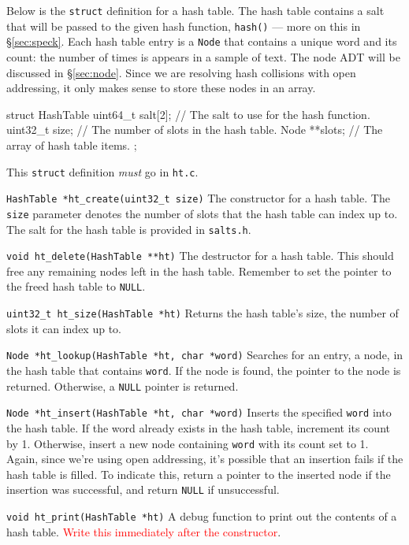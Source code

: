 Below is the \texttt{struct} definition for a hash table. The hash table
contains a salt that will be passed to the given hash function, \texttt{hash()}
--- more on this in \S\ref{sec:speck}. Each hash table entry is a \texttt{Node}
that contains a unique word and its count: the number of times is appears in a
sample of text. The node ADT will be discussed in \S\ref{sec:node}. Since we are
resolving hash collisions with open addressing, it only makes sense to store
these nodes in an array.

\begin{clisting}{}
struct HashTable {
  uint64_t salt[2]; // The salt to use for the hash function.
  uint32_t size;    // The number of slots in the hash table.
  Node **slots;     // The array of hash table items.
};
\end{clisting}

This \texttt{struct} definition \emph{must} go in \texttt{ht.c}.

\begin{funcdoc}{\texttt{HashTable *ht\_create(uint32\_t size)}}
  The constructor for a hash table. The \texttt{size} parameter denotes the
  number of slots that the hash table can index up to. The salt for the hash
  table is provided in \texttt{salts.h}.
\end{funcdoc}

\begin{funcdoc}{\texttt{void ht\_delete(HashTable **ht)}}
  The destructor for a hash table. This should free any remaining nodes left in
  the hash table. Remember to set the pointer to the freed hash table to
  \texttt{NULL}.
\end{funcdoc}

\begin{funcdoc}{\texttt{uint32\_t ht\_size(HashTable *ht)}}
  Returns the hash table's size, the number of slots it can index up to.
\end{funcdoc}

\begin{funcdoc}{\texttt{Node *ht\_lookup(HashTable *ht, char *word)}}
  Searches for an entry, a node, in the hash table that contains \texttt{word}.
  If the node is found, the pointer to the node is returned. Otherwise, a
  \texttt{NULL} pointer is returned.
\end{funcdoc}

\begin{funcdoc}{\texttt{Node *ht\_insert(HashTable *ht, char *word)}}
  Inserts the specified \texttt{word} into the hash table. If the word already
  exists in the hash table, increment its count by 1. Otherwise, insert a new
  node containing \texttt{word} with its count set to 1. Again, since we're
  using open addressing, it's possible that an insertion fails if the hash table
  is filled. To indicate this, return a pointer to the inserted node if the
  insertion was successful, and return \texttt{NULL} if unsuccessful.
\end{funcdoc}

\begin{funcdoc}{\texttt{void ht\_print(HashTable *ht)}}
  A debug function to print out the contents of a hash table.
  \textcolor{red}{Write this immediately after the constructor}.
\end{funcdoc}

